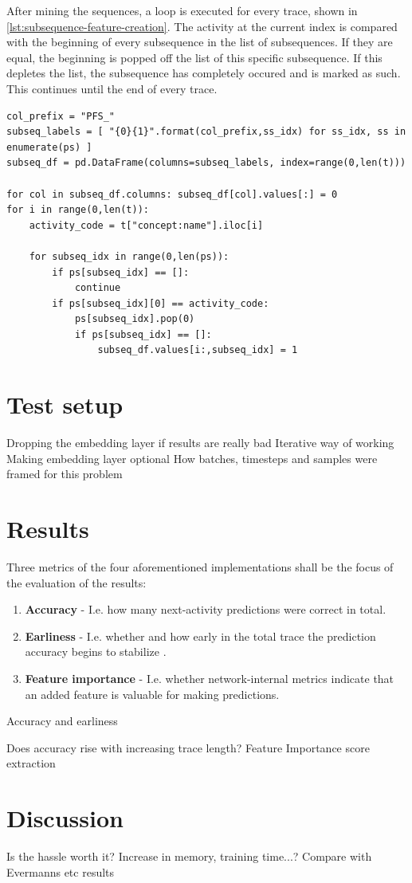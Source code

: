 After mining the sequences, a loop is executed for every trace, shown in \autoref{lst:subsequence-feature-creation}. The activity at the current index is compared with the beginning of every subsequence in the list of subsequences. If they are equal, the beginning is popped off the list of this specific subsequence. If this depletes the list, the subsequence has completely occured and is marked as such. This continues until the end of every trace.

\begin{lstlisting}[caption={Creating the subsequence features.}, label={lst:subsequence-feature-creation}]
col_prefix = "PFS_"
subseq_labels = [ "{0}{1}".format(col_prefix,ss_idx) for ss_idx, ss in enumerate(ps) ]
subseq_df = pd.DataFrame(columns=subseq_labels, index=range(0,len(t)))

for col in subseq_df.columns: subseq_df[col].values[:] = 0
for i in range(0,len(t)):
    activity_code = t["concept:name"].iloc[i]
    
    for subseq_idx in range(0,len(ps)):
        if ps[subseq_idx] == []:
            continue
        if ps[subseq_idx][0] == activity_code:
            ps[subseq_idx].pop(0)
            if ps[subseq_idx] == []:
                subseq_df.values[i:,subseq_idx] = 1
\end{lstlisting}


\section{Test setup}
Dropping the embedding layer if results are really bad
Iterative way of working
Making embedding layer optional
How batches, timesteps and samples were framed for this problem

\section{Results}
Three metrics of the four aforementioned implementations shall be the focus of the evaluation of the results:
\begin{enumerate}
    \item\textbf{Accuracy} - I.e. how many next-activity predictions were correct in total.
    \item\textbf{Earliness} - I.e. whether and how early in the total trace the prediction accuracy begins to stabilize \cite{francescomarino2015}.
    \item\textbf{Feature importance} - I.e. whether network-internal metrics indicate that an added feature is valuable for making predictions.
\end{enumerate}

Accuracy and earliness

Does accuracy rise with increasing trace length?
Feature Importance score extraction

\section{Discussion}
Is the hassle worth it?
Increase in memory, training time...?
Compare with Evermanns etc results